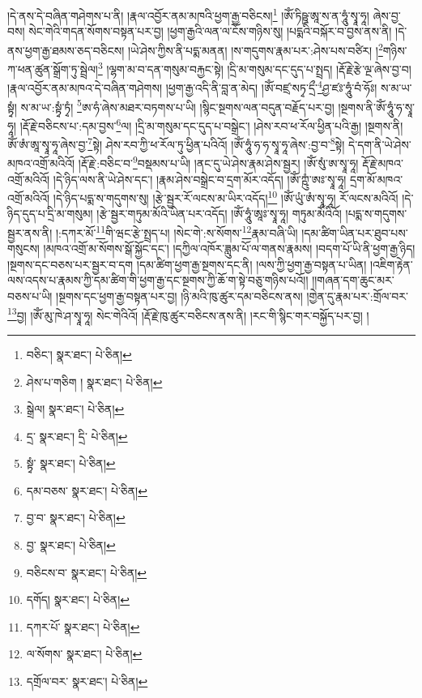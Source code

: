 །དེ་ནས་དེ་བཞིན་གཤེགས་པ་ནི། །རྣལ་འབྱོར་ནམ་མཁའི་ཕྱག་རྒྱ་བཅིངས།\footnote{བཅིང་།  སྣར་ཐང་།  པེ་ཅིན། } །ཨོཾ་ཏིཥྛ་ཨཱ་ས་ན་ཧཱུཾ་སྭཱ་ཧཱ། ཞེས་བྱ་བས། སེང་གེའི་གདན་སོགས་བསྟན་པར་བྱ། །ཕྱག་རྒྱའི་ལན་ལ་ངོས་གཉིས་སུ། །པདྨའི་བསྐོར་བ་བྱས་ནས་ནི། །དེ་ནས་ཕྱག་རྒྱ་ཐམས་ཅད་བཅིངས། །ཡེ་ཤེས་ཀྱིས་ནི་པདྨ་མནན། །ས་གདུགས་རྣམ་པར་:ཤེས་པས་བཙིར། །\footnote{ཤེས་པ་གཅིག །  སྣར་ཐང་།  པེ་ཅིན། }གཉིས་ཀ་ཕན་ཚུན་སྒྲོག་ཏུ་སྦྲེལ།\footnote{སྒྲེལ།  སྣར་ཐང་།  པེ་ཅིན། } །ལྷག་མ་བ་དན་གསུམ་བརྐྱང་སྟེ། །དྲི་མ་གསུམ་དང་དུད་པ་སྤྲད། །རྡོ་རྗེ་རྩེ་ལྔ་ཞེས་བྱ་བ། །རྣལ་འབྱོར་ནམ་མཁའ་དེ་བཞིན་གཤེགས། །ཕྱག་རྒྱ་འདི་ནི་བླ་ན་མེད། །ཨོཾ་བཛྲ་སཏྭ་དྲྀ་\footnote{དྲ་  སྣར་ཐང་། དྲི་  པེ་ཅིན། }ཤྱ་ཛཿ་ཧཱུཾ་བཾ་ཧོཿ། ས་མ་ཡ་སྟྭཾ། ས་མ་ཡ་:སྟྭཾ་ཏྭཾ། \footnote{སྟྭཾ་  སྣར་ཐང་།  པེ་ཅིན། }ཨ་ཧཾ་ཞེས་མཐར་བཏགས་པ་ཡི། །སྙིང་སྔགས་ལན་བདུན་བརྗོད་པར་བྱ། །སྔགས་ནི་ཨོཾ་ཧཱུཾ་ཧ་སྭཱ་ཧཱ། །རྡོ་རྗེ་བཅིངས་པ་:དམ་བྱས་\footnote{དམ་བཅས་  སྣར་ཐང་།  པེ་ཅིན། }ལ། །དྲི་མ་གསུམ་དང་དུད་པ་བསྒྲེང་། །ཤེས་རབ་ཕ་རོལ་ཕྱིན་པའི་རྒྱ། །སྔགས་ནི། ཨོཾ་ཨཾ་ཨཱ་སྭཱ་ཧཱ་ཞེས་བྱ་\footnote{བྱ་བ་  སྣར་ཐང་།  པེ་ཅིན། }སྟེ། ཤེས་རབ་ཀྱི་ཕ་རོལ་ཏུ་ཕྱིན་པའིའོ། །ཨོཾ་ཧཱུཾ་ཧ་ཧ་སྭཱ་ཧཱ་ཞེས་:བྱ་བ་\footnote{བྱ་  སྣར་ཐང་།  པེ་ཅིན། }སྟེ། དེ་དག་ནི་ཡེ་ཤེས་མཁའ་འགྲོ་མའིའོ། །རྡོ་རྗེ་:བཅིང་བ་\footnote{བཅིངས་བ་  སྣར་ཐང་།  པེ་ཅིན། }བསྡམས་པ་ཡི། །ནང་དུ་ཡེ་ཤེས་རྣམ་ཤེས་སྦྱར། །ཨོཾ་སུཾ་ཨ་སྭཱ་ཧཱ། རྡོ་རྗེ་མཁའ་འགྲོ་མའིའོ། །དེ་ཉིད་ལས་ནི་ཡེ་ཤེས་དང་། །རྣམ་ཤེས་བསྒྲེང་བ་དྲག་མོར་འདོད། །ཨོཾ་ཀྵུཾ་ཨཿ་སྭཱ་ཧཱ། དྲག་མོ་མཁའ་འགྲོ་མའིའོ། །དེ་ཉིད་པདྨ་ས་གདུགས་སུ། །རྩེ་སྦྱར་རོ་ལངས་མ་ཡིར་འདོད།\footnote{དགོད།  སྣར་ཐང་།  པེ་ཅིན། } །ཨོཾ་ཡུཾ་ཨཾ་སྭཱ་ཧཱ། རོ་ལངས་མའིའོ། །དེ་ཉིད་དུད་པ་དྲི་མ་གསུམ། །རྩེ་སྦྱར་གཏུམ་མོའི་ཡིན་པར་འདོད། །ཨོཾ་ཧཱུཾ་ཨཱཿ་སྭཱ་ཧཱ། གཏུམ་མོའིའོ། །པདྨ་ས་གདུགས་སྦྱར་ནས་ནི། །:དཀར་མོ་\footnote{དཀར་པོ་  སྣར་ཐང་།  པེ་ཅིན། }གི་ཝང་རྩེ་སྤྲད་པ། །སེང་གེ་:ས་སོགས་\footnote{ལ་སོགས་  སྣར་ཐང་།  པེ་ཅིན། }རྣམ་བཞི་ཡི། །དམ་ཚིག་ཡིན་པར་ཐུབ་པས་གསུངས། །མཁའ་འགྲོ་མ་སོགས་སྒོ་སྐྱོང་དང་། །དཀྱིལ་འཁོར་ཟླུམ་པོ་ལ་གནས་རྣམས། །བདག་པོ་ཡི་ནི་ཕྱག་རྒྱ་ཉིད། །སྔགས་དང་བཅས་པར་སྦྱར་བ་དག །དམ་ཚིག་ཕྱག་རྒྱ་སྔགས་དང་ནི། །ལས་ཀྱི་ཕྱག་རྒྱ་བསྟན་པ་ཡིན། །འཇིག་རྟེན་ལས་འདས་པ་རྣམས་ཀྱི་དམ་ཚིག་གི་ཕྱག་རྒྱ་དང་སྔགས་ཀྱི་ཆོ་ག་སྟེ་བཅུ་གཉིས་པའོ།། །།གཞན་དག་ཆུང་མར་བཅས་པ་ཡི། །སྔགས་དང་ཕྱག་རྒྱ་བསྟན་པར་བྱ། །ཉི་མའི་ཁུ་ཚུར་དམ་བཅིངས་ནས། །གྱེན་དུ་རྣམ་པར་:གྲོལ་བར་\footnote{དགྲོལ་བར་  སྣར་ཐང་།  པེ་ཅིན། }བྱ། །ཨོཾ་མུ་ཁེ་ཤ་སྭཱ་ཧཱ། སེང་གེའིའོ། །རྡོ་རྗེ་ཁུ་ཚུར་བཅིངས་ནས་ནི། །རང་གི་སྙིང་གར་བསྐྱོད་པར་བྱ། །
